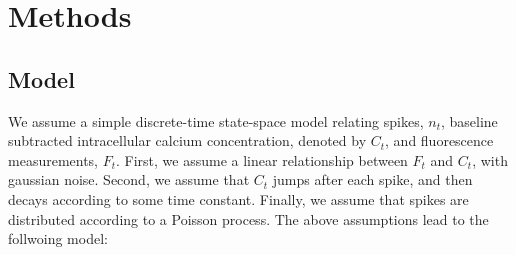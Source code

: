 %
%


\section{Methods} \label{sec:methods}

\subsection{Model}

We assume a simple discrete-time state-space model relating spikes, $n_t$, baseline subtracted intracellular calcium concentration, denoted by $C_t$, and fluorescence measurements, $F_t$.  First, we assume a linear relationship between $F_t$ and $C_t$, with gaussian noise.  Second, we assume that $C_t$ jumps after each spike, and then decays according to some time constant.  Finally, we assume that spikes are distributed according to a Poisson process. The above assumptions lead to the follwoing model:


